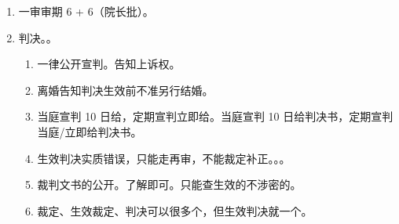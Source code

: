 \begin{enumerate}
\begin{enumerate}
\begin{enumerate}
                  \item {}、离婚诉讼中一方死亡。
                  \item 做题。离婚吗 \,? 终结 \,: [提到了别的人 \,? 中止（流程在谁谁管） \,: 终结]。
                  \item 离婚 vs 无效婚宣告制。
                        \begin{enumerate}
                          \item 无效事由要持续到起诉时，否则视为不存在。
                          \item 不允许调解、撤诉。
                          \item 申请时间。夫妻生前均可申请，夫妻一方 || 双方死亡 1 年内亦可。
                          \item 请求撤销婚姻 \bdy 请求解除婚姻关系。所以死了不是终结诉讼，而是继续审理。
                        \end{enumerate}
                \end{enumerate}
        \end{enumerate}
  \item 一审审期 6 + 6（院长批）。
  \item 判决。。
        \begin{enumerate}
          \item 一律公开宣判。告知上诉权。
          \item 离婚告知判决生效前不准另行结婚。
          \item 当庭宣判 10 日给，定期宣判立即给。当庭宣判 10 日给判决书，定期宣判当庭/立即给判决书。
          \item 生效判决实质错误，只能走再审，不能裁定补正。。。
          \item 裁判文书的公开。了解即可。只能查生效的不涉密的。
          \item 裁定、生效裁定、判决可以很多个，但生效判决就一个。
        \end{enumerate}
\end{enumerate}
